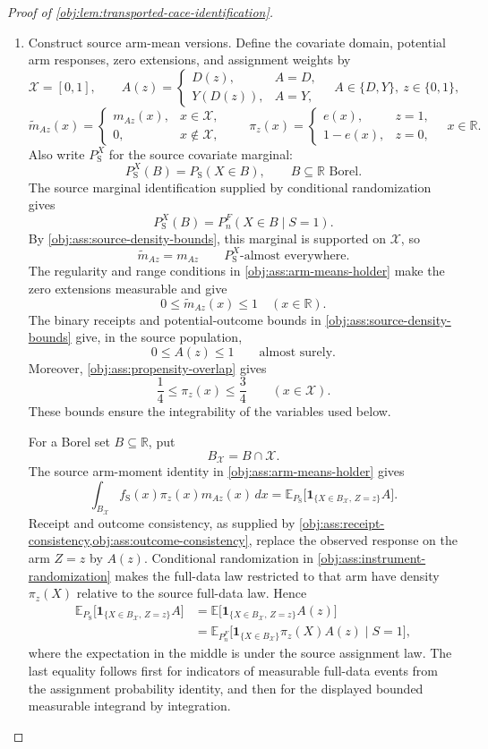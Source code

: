 \documentclass[11pt]{article}
\begin{document}
\begin{proof}[Proof of \cref{obj:lem:transported-cace-identification}]
\begin{enumerate}
\item Construct source arm-mean versions. Define the covariate domain, potential arm responses, zero extensions, and assignment weights by
\[
\mathcal X=[0,1],\qquad
A(z)=
\begin{cases}
D(z),&A=D,\\
Y(D(z)),&A=Y,
\end{cases}
\quad A\in\{D,Y\},\ z\in\{0,1\},
\]
\[
\widetilde m_{Az}(x)=
\begin{cases}
m_{Az}(x),&x\in\mathcal X,\\
0,&x\notin\mathcal X,
\end{cases}
\qquad
\pi_z(x)=
\begin{cases}
e(x),&z=1,\\
1-e(x),&z=0,
\end{cases}
\quad x\in\mathbb R.
\]
Also write \(P_{\mathrm S}^{X}\) for the source covariate marginal:
\[
P_{\mathrm S}^{X}(B)=P_{\mathrm S}(X\in B),
\qquad B\subseteq\mathbb R\text{ Borel}.
\]
The source marginal identification supplied by conditional randomization gives
\[
P_{\mathrm S}^{X}(B)=P_n^F(X\in B\mid S=1).
\]
By \cref{obj:ass:source-density-bounds}, this marginal is supported on \(\mathcal X\), so
\[
\widetilde m_{Az}=m_{Az}
\qquad P_{\mathrm S}^{X}\text{-almost everywhere}.
\]
The regularity and range conditions in \cref{obj:ass:arm-means-holder} make the zero extensions measurable and give
\[
0\le \widetilde m_{Az}(x)\le1
\quad(x\in\mathbb R).
\]
The binary receipts and potential-outcome bounds in
\cref{obj:ass:source-density-bounds} give, in the source population,
\[
0\le A(z)\le1
\qquad\text{almost surely}.
\]
Moreover, \cref{obj:ass:propensity-overlap} gives
\[
\frac14\le\pi_z(x)\le\frac34
\qquad(x\in\mathcal X).
\]
These bounds ensure the integrability of the variables used below.

For a Borel set \(B\subseteq\mathbb R\), put
\[
B_{\mathcal X}=B\cap\mathcal X.
\]
The source arm-moment identity in \cref{obj:ass:arm-means-holder} gives
\[
\int_{B_{\mathcal X}}
 f_{\mathrm S}(x)\pi_z(x)m_{Az}(x)\,dx
=
\mathbb E_{P_{\mathrm S}}
 \bigl[\mathbf1_{\{X\in B_{\mathcal X},\,Z=z\}}A\bigr].
\]
Receipt and outcome consistency, as supplied by
\cref{obj:ass:receipt-consistency,obj:ass:outcome-consistency},
replace the observed response on the arm \(Z=z\) by \(A(z)\).
Conditional randomization in \cref{obj:ass:instrument-randomization}
makes the full-data law restricted to that arm have density
\(\pi_z(X)\) relative to the source full-data law. Hence
\[
\begin{aligned}
\mathbb E_{P_{\mathrm S}}
 \bigl[\mathbf1_{\{X\in B_{\mathcal X},\,Z=z\}}A\bigr]
&=\mathbb E
 \bigl[\mathbf1_{\{X\in B_{\mathcal X},\,Z=z\}}A(z)\bigr]\\
&=\mathbb E_{P_n^F}
 \bigl[\mathbf1_{\{X\in B_{\mathcal X}\}}\pi_z(X)A(z)
       \mid S=1\bigr],
\end{aligned}
\]
where the expectation in the middle is under the source assignment law. The last equality follows first for indicators of measurable full-data events from the assignment probability identity, and then for the displayed bounded measurable integrand by integration.


\end{enumerate}
\end{proof}
\end{document}
